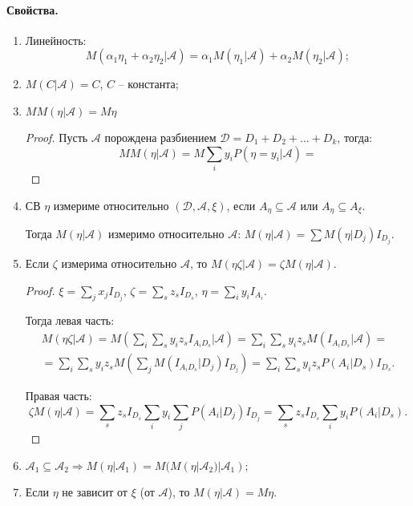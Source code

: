 \paragraph{Свойства.}
\begin{enumerate}
  \item Линейность:
    \[
      M(\alpha_1 \eta_1 + \alpha_2 \eta_2 | \mathcal{A}) =
      \alpha_1 M(\eta_1 | \mathcal{A}) + \alpha_2 M(\eta_2 | \mathcal{A});
    \]

  \item $M(C | \mathcal{A}) = C$, $C$ -- константа;

  \item $MM(\eta | \mathcal{A}) = M\eta$
    \begin{proof}
      Пусть $\mathcal{A}$ порождена разбиением $\mathcal{D} = D_1 + D_2 + \dots + D_k$, тогда:
      \[
        MM(\eta | \mathcal{A}) = M \sum_i y_i P(\eta = y_i | \mathcal{A}) =
      \]
    \end{proof}

  \item \begin{definition}
      СВ $\eta$ измериме относительно $(\mathcal{D}, \mathcal{A}, \xi)$, если
      $A_{\eta} \subseteq \mathcal{A}$ или $A_\eta \subseteq A_\xi$.
    \end{definition}

    Тогда $M(\eta | \mathcal{A})$ измеримо относительно $\mathcal{A}$:
      $M(\eta | \mathcal{A}) = \sum M(\eta | D_j) I_{D_j}$.

    \item Если $\zeta$ измерима относительно $\mathcal{A}$, то $M(\eta \zeta | \mathcal{A}) = \zeta M(\eta | \mathcal{A})$.
    \begin{proof}
      $\xi = \sum_j x_j I_{D_j}$, $\zeta = \sum_s z_s I_{D_s}$, $\eta = \sum_i y_i I_{A_i}$.

      Тогда левая часть:
      \begin{multline*}
        M(\eta\zeta | \mathcal{A}) = M \left( \sum_i \sum_s y_i z_s I_{A_i D_s} | \mathcal{A} \right) 
        = \sum_i \sum_s y_i z_s M \left( I_{A_i D_s} | \mathcal{A} \right) = \\
        = \sum_i \sum_s y_i z_s M \left( \sum_j M(I_{A_i D_s} | D_j) I_{D_j} \right) 
        = \sum_i \sum_s y_i z_s P(A_i | D_s) I_{D_s}.
      \end{multline*}

      Правая часть:
      \[
        \zeta M(\eta | \mathcal{A}) = \sum_s z_s I_{D_s} \sum_i y_i \sum_j P(A_i | D_j) I_{D_j}
        = \sum_s z_s I_{D_s} \sum_i y_i P(A_i | D_s).
      \]
    \end{proof}

  \item $\mathcal{A}_1 \subseteq \mathcal{A}_2 \Rightarrow M(\eta | \mathcal{A}_1) = M( M(\eta | \mathcal{A}_2) | \mathcal{A}_1)$;

  \item Если $\eta$ не зависит от $\xi$ (от $\mathcal{A}$), то $M(\eta | \mathcal{A}) = M\eta$.
\end{enumerate}

